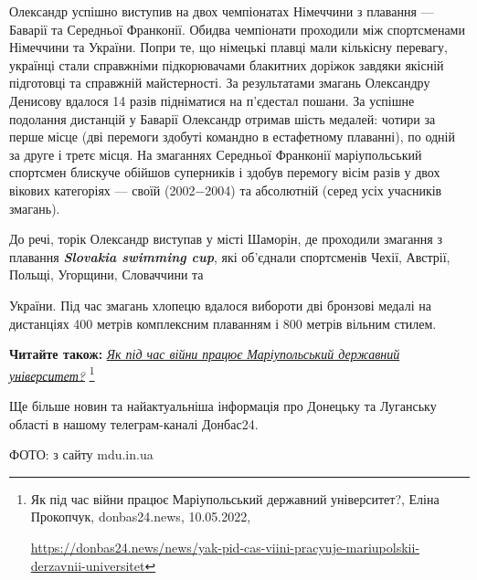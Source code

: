 
Олександр успішно виступив на двох чемпіонатах Німеччини з плавання — Баварії
та Середньої Франконії. Обидва чемпіонати проходили між спортсменами Німеччини
та України. Попри те, що німецькі плавці мали кількісну перевагу, українці
стали справжніми підкорювачами блакитних доріжок завдяки якісній підготовці та
справжній майстерності. За результатами змагань Олександру Денисову вдалося 14
разів підніматися на п'єдестал пошани. За успішне подолання дистанцій у Баварії
Олександр отримав шість медалей: чотири за перше місце (дві перемоги здобуті
командно в естафетному плаванні), по одній за друге і третє місця. На змаганнях
Середньої Франконії маріупольський спортсмен блискуче обійшов суперників і
здобув перемогу вісім разів у двох вікових категоріях — своїй (2002−2004) та
абсолютній (серед усіх учасників змагань).


До речі, торік Олександр виступав у місті Шаморін, де проходили змагання з
плавання \emph{\textbf{Slovakia swimming cup}}, які об'єднали спортсменів Чехії, Австрії,
Польщі, Угорщини, Словаччини та\par\noindent України. Під час змагань хлопецю вдалося
вибороти дві бронзові медалі на дистанціях 400 метрів комплексним плаванням і
800 метрів вільним стилем.

\textbf{Читайте також:} \href{https://donbas24.news/news/yak-pid-cas-viini-pracyuje-mariupolskii-derzavnii-universitet}{\emph{Як під час війни працює Маріупольський державний університет?}}%
\footnote{Як під час війни працює Маріупольський державний університет?, Еліна Прокопчук, donbas24.news, 10.05.2022, \par%
\url{https://donbas24.news/news/yak-pid-cas-viini-pracyuje-mariupolskii-derzavnii-universitet}%
}

Ще більше новин та найактуальніша інформація про Донецьку та Луганську області
в нашому телеграм-каналі Донбас24.

ФОТО: з сайту mdu.in.ua

